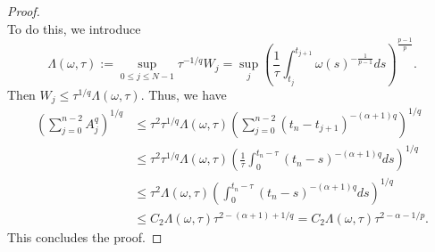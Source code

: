 \documentclass[10pt,a4paper]{amsart}
\begin{document}
\begin{proof}
\begin{equation}
\end{equation}
To do this, we introduce
\begin{equation}
    \Lambda(\omega, \tau) := \sup_{0 \le j \le N-1} \tau^{-1/q} W_j = \sup_{j} \left( \frac{1}{\tau} \int_{t_j}^{t_{j+1}} \omega(s)^{-\frac{1}{p-1}} ds \right)^{\frac{p-1}{p}}.
\end{equation}
Then $W_j \le \tau^{1/q} \Lambda(\omega, \tau)$. Thus, we have
\begin{align}
    \left( \sum_{j=0}^{n-2} A_j^q \right)^{1/q} &\le \tau^2 \tau^{1/q} \Lambda(\omega, \tau) \left( \sum_{j=0}^{n-2} (t_n - t_{j+1})^{-(\alpha+1)q} \right)^{1/q} \nonumber \\
    &\le \tau^2 \tau^{1/q} \Lambda(\omega, \tau) \left( \frac{1}{\tau} \int_0^{t_n-\tau} (t_n - s)^{-(\alpha+1)q} ds \right)^{1/q} \nonumber \\
    &\le \tau^2 \Lambda(\omega, \tau) \left( \int_0^{t_n-\tau} (t_n - s)^{-(\alpha+1)q} ds \right)^{1/q} \nonumber \\
    &\le C_2 \Lambda(\omega, \tau) \tau^{2-(\alpha+1) + 1/q} = C_2 \Lambda(\omega, \tau) \tau^{2-\alpha-1/p}.
\end{align}
This concludes the proof.
\end{proof}
\end{document}
